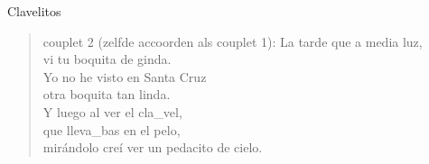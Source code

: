 \begin{song}[vals]{Clavelitos}
\begin{verse}{couplet 2 (zelfde accoorden als couplet 1):}
La tarde que a media luz,\\
vi tu boquita de ginda.\\
Yo no he visto en Santa Cruz\\
otra boquita tan linda. \hspace{1em} \hspace{1em} \hspace{1em}\\
Y luego al ver el cla\_vel,\\
\hspace{1em} que lleva\_bas  \hspace{1em} en el pelo, \hspace{1em} \hspace{1em} \hspace{1em}\\
mirándolo creí  ver
un pedacito de cielo.
\end{verse}
\end{song}
